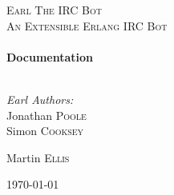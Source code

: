 \begin{titlepage}
\begin{center}

\textsc{\LARGE Earl The IRC Bot}\\[1.5cm]

\textsc{\Large An Extensible Erlang IRC Bot}\\[0.5cm]

\HRule \\[0.4cm]
{ \huge \bfseries Documentation \\[0.4cm] }
\HRule \\[1.5cm]

\noindent
\begin{minipage}{0.4\textwidth}
\begin{flushleft} \large
\emph{Earl Authors:}\\
Jonathan \textsc{Poole}\\
Simon \textsc{Cooksey}\\
\end{flushleft}

\end{minipage}%
\begin{minipage}{0.4\textwidth}
\begin{flushright} \large
\break
Martin \textsc{Ellis}\\
\end{flushright}
\end{minipage}

\vfill

{\large \today}

\end{center}
\end{titlepage}

